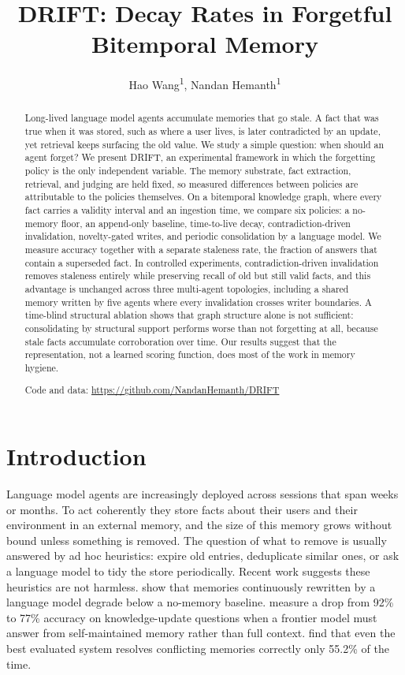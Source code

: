 \documentclass[letterpaper]{article} %
\title{DRIFT: Decay Rates in Forgetful Bitemporal Memory}
\author{
    Hao Wang\textsuperscript{\rm 1},
    Nandan Hemanth\textsuperscript{\rm 1}\corresponding
}
\begin{document}
\maketitle

\begin{abstract}
Long-lived language model agents accumulate memories that go stale. A fact that was true when it was stored, such as where a user lives, is later contradicted by an update, yet retrieval keeps surfacing the old value. We study a simple question: when should an agent forget? We present DRIFT, an experimental framework in which the forgetting policy is the only independent variable. The memory substrate, fact extraction, retrieval, and judging are held fixed, so measured differences between policies are attributable to the policies themselves. On a bitemporal knowledge graph, where every fact carries a validity interval and an ingestion time, we compare six policies: a no-memory floor, an append-only baseline, time-to-live decay, contradiction-driven invalidation, novelty-gated writes, and periodic consolidation by a language model. We measure accuracy together with a separate staleness rate, the fraction of answers that contain a superseded fact. In controlled experiments, contradiction-driven invalidation removes staleness entirely while preserving recall of old but still valid facts, and this advantage is unchanged across three multi-agent topologies, including a shared memory written by five agents where every invalidation crosses writer boundaries. A time-blind structural ablation shows that graph structure alone is not sufficient: consolidating by structural support performs worse than not forgetting at all, because stale facts accumulate corroboration over time. Our results suggest that the representation, not a learned scoring function, does most of the work in memory hygiene.

Code and data: \url{https://github.com/NandanHemanth/DRIFT}
\end{abstract}

\section{Introduction}

Language model agents are increasingly deployed across sessions that span weeks or months. To act coherently they store facts about their users and their environment in an external memory, and the size of this memory grows without bound unless something is removed. The question of what to remove is usually answered by ad hoc heuristics: expire old entries, deduplicate similar ones, or ask a language model to tidy the store periodically. Recent work suggests these heuristics are not harmless. \citet{zhang2026faulty} show that memories continuously rewritten by a language model degrade below a no-memory baseline. \citet{patel2026supersede} measure a drop from 92\% to 77\% accuracy on knowledge-update questions when a frontier model must answer from self-maintained memory rather than full context. \citet{chao2026stale} find that even the best evaluated system resolves conflicting memories correctly only 55.2\% of the time.
\end{document}
